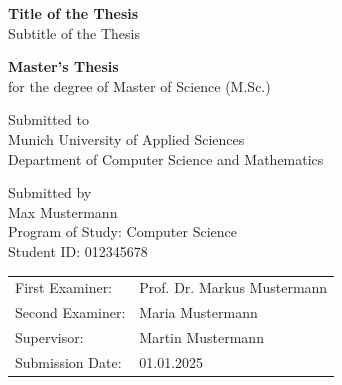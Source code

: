 \begin{titlepage}
  \thispagestyle{empty}


  \vspace{2cm}

  \begin{center}
    {\LARGE \textbf{Title of the Thesis} \\}
    \vspace{0.5cm}
    {\large Subtitle of the Thesis}

    \vspace{1.2cm}
    {\large \textbf{Master's Thesis} \\}
    \vspace{0.2cm}
    for the degree of Master of Science (M.Sc.)

    \vspace{1.2cm}
    Submitted to \\
    Munich University of Applied Sciences \\
    Department of Computer Science and Mathematics

    \vspace{1.2cm}
    Submitted by \\
    Max Mustermann \\
    Program of Study: Computer Science\\
    Student ID: 012345678
  \end{center}

  \vfill

  \begingroup
  \renewcommand{\arraystretch}{1.0}
  \begin{tabular}{@{}ll@{}}
    First Examiner:  & Prof. Dr. Markus Mustermann \\
    Second Examiner: & Maria Mustermann            \\
    Supervisor:      & Martin Mustermann           \\
    Submission Date: & 01.01.2025                  \\
  \end{tabular}
  \endgroup

\end{titlepage}
\addtocounter{page}{1}

